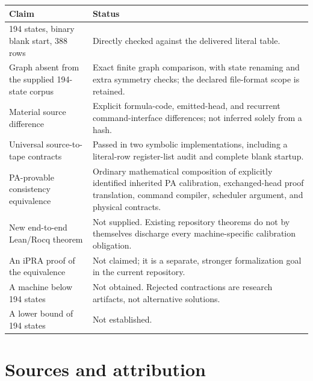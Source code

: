 \documentclass[11pt,letterpaper]{article}
\begin{document}
\begin{longtable}{@{}p{}p{}@{}}
\toprule Claim & Status\\\midrule\endhead
194 states, binary blank start, 388 rows & Directly checked against the delivered literal table.\\[3pt]
Graph absent from the supplied 194-state corpus & Exact finite graph comparison, with state renaming and extra symmetry checks; the declared file-format scope is retained.\\[3pt]
Material source difference & Explicit formula-code, emitted-head, and recurrent command-interface differences; not inferred solely from a hash.\\[3pt]
Universal source-to-tape contracts & Passed in two symbolic implementations, including a literal-row register-list audit and complete blank startup.\\[3pt]
PA-provable consistency equivalence & Ordinary mathematical composition of explicitly identified inherited PA calibration, exchanged-head proof translation, command compiler, scheduler argument, and physical contracts.\\[3pt]
New end-to-end Lean/Rocq theorem & Not supplied. Existing repository theorems do not by themselves discharge every machine-specific calibration obligation.\\[3pt]
An iPRA proof of the equivalence & Not claimed; it is a separate, stronger formalization goal in the current repository.\\[3pt]
A machine below 194 states & Not obtained. Rejected contractions are research artifacts, not alternative solutions.\\[3pt]
A lower bound of 194 states & Not established.\\
\bottomrule
\end{longtable}

\section*{Sources and attribution}
\end{document}
